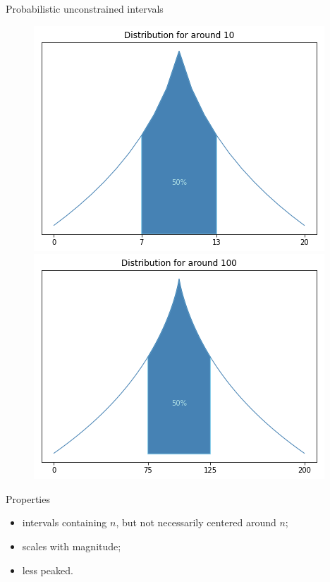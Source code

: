 \documentclass[xcolor=table, hyperref={pdfpagelabels=false}]{beamer}
\begin{document}
\begin{frame}{Probabilistic unconstrained intervals}
\begin{figure}
	\includegraphics[width=.45\textwidth]{./images/around_10_prob_unconstrained.png}
	\includegraphics[width=.45\textwidth]{./images/around_100_prob_unconstrained.png}
\end{figure}

\begin{block}{Properties}
	\begin{itemize}
		\item intervals containing $n$, but not necessarily centered around $n$;
		\item scales with magnitude;
		\item less peaked.
	\end{itemize}
\end{block}
\end{frame}
\end{document}
